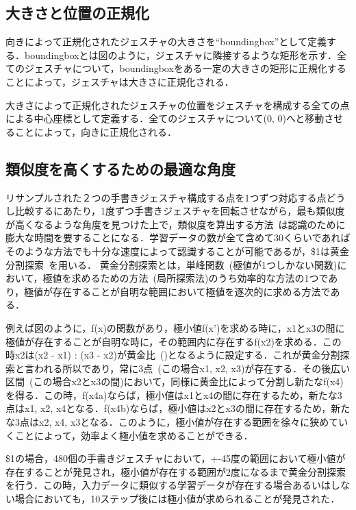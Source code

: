\subsection{大きさと位置の正規化}
向きによって正規化されたジェスチャの大きさを``boundingbox''として定義する．boundingboxとは図のように，ジェスチャに隣接するような矩形を示す．全てのジェスチャについて，boundingboxをある一定の大きさの矩形に正規化することによって，ジェスチャは大きさに正規化される．

大きさによって正規化されたジェスチャの位置をジェスチャを構成する全ての点による中心座標として定義する．全てのジェスチャについて(0, 0)へと移動させることによって，向きに正規化される．

\subsection{類似度を高くするための最適な角度}
リサンプルされた２つの手書きジェスチャ構成する点を1つずつ対応する点どうし比較するにあたり，1度ずつ手書きジェスチャを回転させながら，最も類似度が高くなるような角度を見つけた上で，類似度を算出する方法~\cite{Kara:2005:ITS:1652319.1652712}は認識のために膨大な時間を要することになる．学習データの数が全て含めて30くらいであればそのような方法でも十分な速度によって認識することが可能であるが，\$1は黄金分割探索~\cite{Press:1992:NRC:148286}を用いる．
黄金分割探索とは，単峰関数~(極値が1つしかない関数)において，極値を求めるための方法~(局所探索法)のうち効率的な方法の1つであり，極値が存在することが自明な範囲において極値を逐次的に求める方法である．

例えば図のように，f(x)の関数があり，極小値f(x')を求める時に，x1とx3の間に極値が存在することが自明な時に，その範囲内に存在するf(x2)を求める．この時x2は(x2 - x1) : (x3 - x2)が黄金比~()となるように設定する．これが黄金分割探索と言われる所以であり，常に3点~(この場合x1, x2, x3)が存在する．その後広い区間~(この場合x2とx3の間)において，同様に黄金比によって分割し新たなf(x4)を得る．この時，f(x4a)ならば，極小値はx1とx4の間に存在するため，新たな3点はx1, x2, x4となる．f(x4b)ならば，極小値はx2とx3の間に存在するため，新たな3点はx2, x4, x3となる．このように，極小値が存在する範囲を徐々に狭めていくことによって，効率よく極小値を求めることができる．

\$1の場合，480個の手書きジェスチャにおいて，+-45度の範囲において極小値が存在することが発見され，極小値が存在する範囲が2度になるまで黄金分割探索を行う．この時，入力データに類似する学習データが存在する場合あるいはしない場合においても，10ステップ後には極小値が求められることが発見された．

